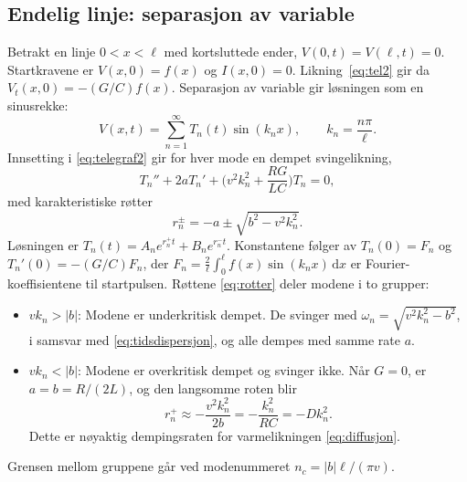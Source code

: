 \documentclass[11pt,a4paper]{article}
\numberwithin{equation}{section}
\numberwithin{figure}{section}
\numberwithin{table}{section}
\newcommand{\dd}{\mathrm{d}}
\begin{document}
\subsection{Endelig linje: separasjon av variable}\label{sec:separasjon}
Betrakt en linje $0 < x < \ell$ med kortsluttede ender, $V(0,t) = V(\ell,t) = 0$.
Startkravene er $V(x,0) = f(x)$ og $I(x,0) = 0$. Likning~\eqref{eq:tel2} gir da
$V_t(x,0) = -(G/C)f(x)$. Separasjon av variable \cite{kreyszig2011} gir
løsningen som en sinusrekke:
\begin{equation}
  V(x,t) = \sum_{n=1}^{\infty} T_n(t)\sin(k_nx), \qquad k_n = \frac{n\pi}{\ell}. \label{eq:rekke}
\end{equation}
Innsetting i \eqref{eq:telegraf2} gir for hver mode en dempet svingelikning,
\begin{equation}
  T_n'' + 2aT_n' + \Big(v^2k_n^2 + \frac{RG}{LC}\Big)T_n = 0,
\end{equation}
med karakteristiske røtter
\begin{equation}
  r_n^{\pm} = -a \pm \sqrt{b^2 - v^2k_n^2}. \label{eq:rotter}
\end{equation}
Løsningen er $T_n(t) = A_ne^{r_n^+t} + B_ne^{r_n^-t}$. Konstantene følger av
$T_n(0) = F_n$ og $T_n'(0) = -(G/C)F_n$, der
$F_n = \frac{2}{\ell}\int_0^\ell f(x)\sin(k_nx)\,\dd x$ er Fourier-koeffisientene
til startpulsen. Røttene \eqref{eq:rotter} deler modene i to grupper:
\begin{itemize}
  \item $vk_n > |b|$: Modene er underkritisk dempet. De svinger med
        $\omega_n = \sqrt{v^2k_n^2 - b^2}$, i samsvar med
        \eqref{eq:tidsdispersjon}, og alle dempes med samme rate $a$.
  \item $vk_n < |b|$: Modene er overkritisk dempet og svinger ikke. Når $G = 0$,
        er $a = b = R/(2L)$, og den langsomme roten blir
        \begin{equation}
          r_n^+ \approx -\frac{v^2k_n^2}{2b} = -\frac{k_n^2}{RC} = -Dk_n^2. \label{eq:langsom}
        \end{equation}
        Dette er nøyaktig dempingsraten for varmelikningen \eqref{eq:diffusjon}.
\end{itemize}
Grensen mellom gruppene går ved modenummeret $n_c = |b|\ell/(\pi v)$.
\end{document}
